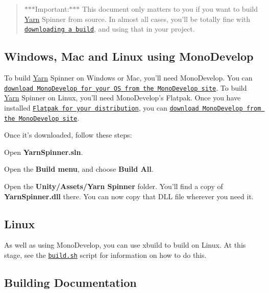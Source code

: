 \begin{quotation}
$\ast$$\ast$$\ast$\-Important\-:$\ast$$\ast$$\ast$ This document only matters to you if you want to build \hyperlink{a00026}{Yarn} Spinner from source. In almost all cases, you'll be totally fine with \href{https://github.com/thesecretlab/YarnSpinner/releases}{\tt downloading a build}, and using that in your project.

\end{quotation}


\subsection*{Windows, Mac and Linux using Mono\-Develop}

To build \hyperlink{a00026}{Yarn} Spinner on Windows or Mac, you'll need Mono\-Develop. You can \href{http://www.monodevelop.com/download/}{\tt download Mono\-Develop for your O\-S from the Mono\-Develop site}. To build \hyperlink{a00026}{Yarn} Spinner on Linux, you'll need Mono\-Develop's Flatpak. Once you have installed \href{http://flatpak.org/getting.html}{\tt Flatpak for your distribution}, you can \href{http://www.monodevelop.com/download/linux/}{\tt download Mono\-Develop from the Mono\-Develop site}.

Once it's downloaded, follow these steps\-:


\begin{DoxyItemize}
\item Open {\bfseries Yarn\-Spinner.\-sln}.
\item Open the {\bfseries Build menu}, and choose {\bfseries Build All}.
\item Open the {\bfseries Unity/\-Assets/\-Yarn Spinner} folder. You'll find a copy of {\bfseries Yarn\-Spinner.\-dll} there. You can now copy that D\-L\-L file wherever you need it.
\end{DoxyItemize}

\subsection*{Linux}

As well as using Mono\-Develop, you can use xbuild to build on Linux. At this stage, see the \href{../build.sh}{\tt build.\-sh} script for information on how to do this.

\subsection*{Building Documentation}

